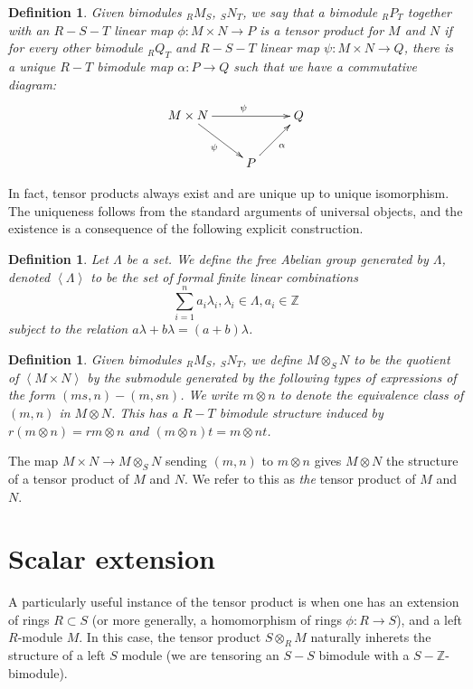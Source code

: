 \documentclass[12pt]{report}
\theoremstyle{plain}
\newtheorem{defn}[thm]{Definition}
\newcommand{\ZZ}{\mathbb{Z}}
\begin{document}
\begin{defn}
Given bimodules $ _R M_S$, $_S N_T$, we say that a bimodule $ _R P_T$
together with an $R-S-T$ linear map $\phi: M \times N \to P$ is a tensor product
for $M$ and $N$ if for every other bimodule $_R Q_T$ and $R-S-T$ linear map
$\psi : M \times N \to Q$, there is a unique $R-T$ bimodule map $\alpha : P
\to Q$ such that we have a commutative diagram:
\[\xymatrix{
M \times N \ar[rd]_{\psi} \ar[rr]^\psi & & Q \\
 & P \ar[ru]_{\alpha}
}\]
\end{defn}

In fact, tensor products always exist and are unique up to unique
isomorphism. The uniqueness follows from the standard arguments of
universal objects, and the existence is a consequence of the following
explicit construction.

\begin{defn}
Let $\Lambda$ be a set. We define the free Abelian group
generated by $\Lambda$, denoted $\left<\Lambda\right>$ to be the set
of formal finite linear combinations
\[\sum_{i = 1}^n a_i \lambda_i , \lambda_i \in
\Lambda, a_i \in \ZZ \]
subject to the relation $a \lambda + b \lambda = (a + b) \lambda$.
\end{defn}

\begin{defn}
Given bimodules $_R M _S$, $_S N _T$, we define $M \otimes_S N$ to be the
quotient of $\left< M \times N \right>$ by the submodule generated by
the following types of expressions of the form $(ms, n) - (m, sn)$.
We write $m \otimes n$ to denote the equivalence class of $(m,
n)$ in $M \otimes N$. This has a $R-T$ bimodule structure induced by $r(m
\otimes n) = rm \otimes n$ and $(m \otimes n) t = m \otimes nt$.
\end{defn}

The map $M \times N \to M \otimes_S N$ sending $(m, n)$ to $m \otimes n$
gives $M \otimes N$ the structure of a tensor product of $M$ and $N$. We
refer to this as \textit{the} tensor product of $M$ and $N$.

\section{Scalar extension}

A particularly useful instance of the tensor product is when one has an
extension of rings $R \subset S$ (or more generally, a homomorphism of
rings $\phi : R \to S$), and a left $R$-module $M$. In this case, the
tensor product $S \otimes_R M$ naturally inherets the structure of a left
$S$ module (we are tensoring an $S-S$ bimodule with a $S-\ZZ$-bimodule).
\end{document}
